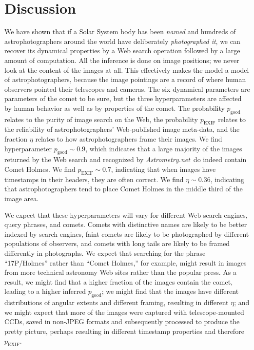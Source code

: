 \documentclass[12pt,preprint]{aastex}
\newcommand{\project}[1]{\textsl{#1}}
\newcommand{\An}{\project{Astrometry.net}}
\newcommand{\pgood}{p_\mathrm{good}}
\newcommand{\exif}{\mathrm{EXIF}}
\newcommand{\pexif}{p_\exif}
\begin{document}
\section{Discussion}

We have shown that if a Solar System body has been \emph{named} and
hundreds of astrophotographers around the world have deliberately
\emph{photographed it}, we can recover its dynamical properties by a
Web search operation followed by a large amount of computation.  All
the inference is done on image positions; we never look at the content
of the images at all.  This effectively makes the model a model of
astrophotographers, because the image pointings are a record of where
human observers pointed their telescopes and cameras.  The six
dynamical parameters are parameters of the comet to be sure, but the
three hyperparameters are affected by human behavior as well as by
properties of the comet.  The probability $\pgood$ relates to the
purity of image search on the Web, the probability $\pexif$ relates to
the reliability of astrophotographers' Web-published image meta-data,
and the fraction $\eta$ relates to how astrophotographers frame their
images.
%
We find hyperparameter $\pgood \sim 0.9$, which indicates that a large
majority of the images returned by the Web search and recognized by
\An\ do indeed contain Comet Holmes.  We find $\pexif \sim 0.7$,
indicating that when images have timestamps in their headers, they are
often correct.  We find $\eta \sim 0.36$, indicating that
astrophotographers tend to place Comet Holmes in the middle third of
the image area.  

We expect that these hyperparameters will vary for different Web
search engines, query phrases, and comets.  Comets with distinctive
names are likely to be better indexed by search engines, faint comets
are likely to be photographed by different populations of observers,
and comets with long tails are likely to be framed differently in
photographs.  We expect that searching for the phrase ``17P/Holmes''
rather than ``Comet Holmes,'' for example, might result in images from
more technical astronomy Web sites rather than the popular press.  As
a result, we might find that a higher fraction of the images contain
the comet, leading to a higher inferred $\pgood$; we might find that
the images have different distributions of angular extents and
different framing, resulting in different $\eta$; and we might expect
that more of the images were captured with telescope-mounted CCDs,
saved in non-JPEG formats and subsequently processed to produce the
pretty picture, perhaps resulting in different timestamp properties
and therefore $\pexif$.
\end{document}
